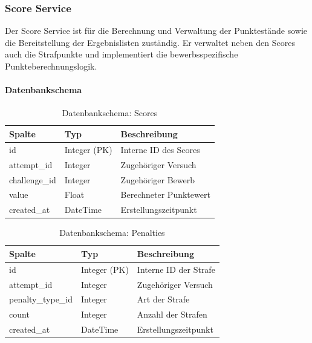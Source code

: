 \newpage

\subsubsection{Score Service}
\label{sec:score_service}
Der Score Service ist für die Berechnung und Verwaltung der 
Punktestände sowie die Bereitstellung der Ergebnislisten 
zuständig. Er verwaltet neben den Scores auch die Strafpunkte und
implementiert die bewerbsspezifische Punkteberechnungslogik.

\paragraph{Datenbankschema}
\begin{table}[h]
    \centering
    \begin{tabular}{|l|l|l|}
        \hline
        \textbf{Spalte} & \textbf{Typ} & \textbf{Beschreibung} \\
        \hline
        id & Integer (PK) & Interne ID des Scores \\
        attempt\_id & Integer & Zugehöriger Versuch \\
        challenge\_id & Integer & Zugehöriger Bewerb \\
        value & Float & Berechneter Punktewert \\
        created\_at & DateTime & Erstellungszeitpunkt \\
        \hline
    \end{tabular}
    \caption{Datenbankschema: Scores}
    \label{tab:score_schema}
\end{table}

\begin{table}[h]
    \centering
    \begin{tabular}{|l|l|l|}
        \hline
        \textbf{Spalte} & \textbf{Typ} & \textbf{Beschreibung} \\
        \hline
        id & Integer (PK) & Interne ID der Strafe \\
        attempt\_id & Integer & Zugehöriger Versuch \\
        penalty\_type\_id & Integer & Art der Strafe \\
        count & Integer & Anzahl der Strafen \\
        created\_at & DateTime & Erstellungszeitpunkt \\
        \hline
    \end{tabular}
    \caption{Datenbankschema: Penalties}
    \label{tab:penalty_schema}
\end{table}

